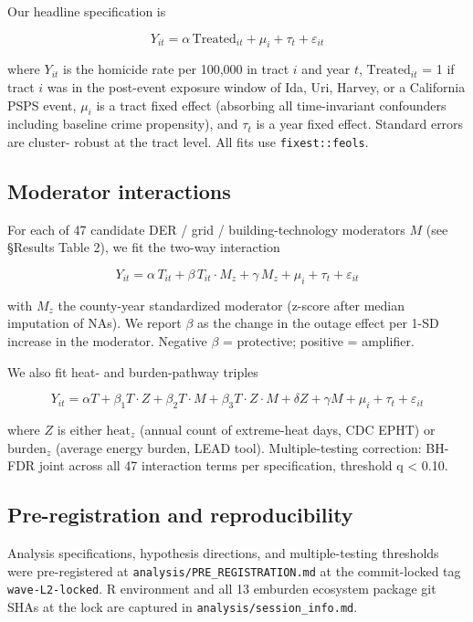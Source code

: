 \documentclass[
]{article}
\begin{document}
Our headline specification is

\[
Y_{it} = \alpha \, \mathrm{Treated}_{it} + \mu_i + \tau_t + \varepsilon_{it}
\]

where \(Y_{it}\) is the homicide rate per 100,000 in tract \(i\) and
year \(t\), \(\mathrm{Treated}_{it}\) = 1 if tract \(i\) was in the
post-event exposure window of Ida, Uri, Harvey, or a California PSPS
event, \(\mu_i\) is a tract fixed effect (absorbing all time-invariant
confounders including baseline crime propensity), and \(\tau_t\) is a
year fixed effect. Standard errors are cluster- robust at the tract
level. All fits use \texttt{fixest::feols}.

\hypertarget{moderator-interactions}{%
\subsection{Moderator interactions}\label{moderator-interactions}}

For each of 47 candidate DER / grid / building-technology moderators
\(M\) (see §Results Table 2), we fit the two-way interaction

\[
Y_{it} = \alpha \, T_{it} + \beta \, T_{it} \cdot M_z + \gamma \, M_z
       + \mu_i + \tau_t + \varepsilon_{it}
\]

with \(M_z\) the county-year standardized moderator (z-score after
median imputation of NAs). We report \(\beta\) as the change in the
outage effect per 1-SD increase in the moderator. Negative \(\beta\) =
protective; positive = amplifier.

We also fit heat- and burden-pathway triples

\[
Y_{it} = \alpha T + \beta_1 T \cdot Z + \beta_2 T \cdot M + \beta_3 T \cdot Z \cdot M
       + \delta Z + \gamma M + \mu_i + \tau_t + \varepsilon_{it}
\]

where \(Z\) is either \(\mathrm{heat}_z\) (annual count of extreme-heat
days, CDC EPHT) or \(\mathrm{burden}_z\) (average energy burden, LEAD
tool). Multiple-testing correction: BH-FDR joint across all 47
interaction terms per specification, threshold q \textless{} 0.10.

\hypertarget{pre-registration-and-reproducibility}{%
\subsection{Pre-registration and
reproducibility}\label{pre-registration-and-reproducibility}}

Analysis specifications, hypothesis directions, and multiple-testing
thresholds were pre-registered at \texttt{analysis/PRE\_REGISTRATION.md}
at the commit-locked tag \texttt{wave-L2-locked}. R environment and all
13 emburden ecosystem package git SHAs at the lock are captured in
\texttt{analysis/session\_info.md}.
\end{document}
